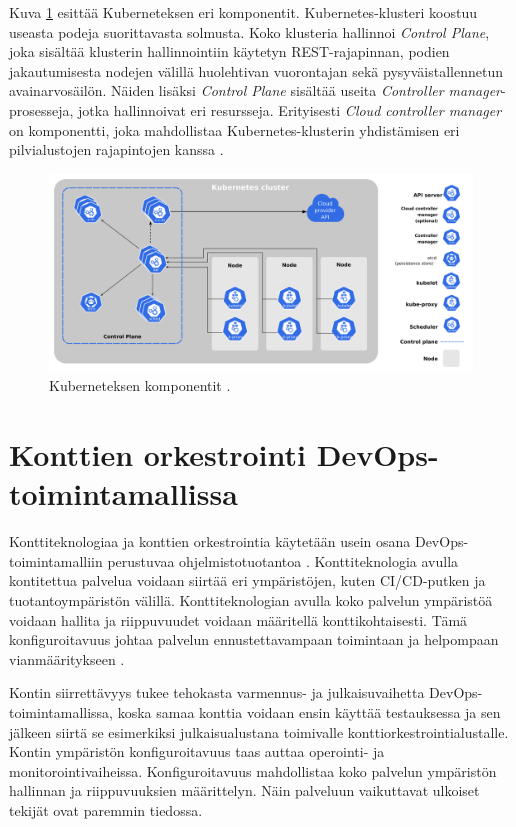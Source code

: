 Kuva \ref{fig:kubernetes} esittää Kuberneteksen eri komponentit.
Kubernetes-klusteri koostuu useasta podeja suorittavasta solmusta.
Koko klusteria hallinnoi \textit{Control Plane}, joka sisältää klusterin hallinnointiin käytetyn REST-rajapinnan, podien jakautumisesta nodejen välillä huolehtivan vuorontajan sekä pysyväistallennetun avainarvosäilön.
Näiden lisäksi \textit{Control Plane} sisältää useita \textit{Controller manager}-prosesseja, jotka hallinnoivat eri resursseja.
Erityisesti \textit{Cloud controller manager} on komponentti, joka mahdollistaa Kubernetes-klusterin yhdistämisen eri pilvialustojen rajapintojen kanssa \cite{components23}.

\begin{figure}[ht]
\begin{center}
\includegraphics[width=1\textwidth]{figures/kubernetes_components.png}
\caption{Kuberneteksen komponentit \cite{components23}\label{fig:kubernetes}.}
\end{center}
\end{figure}

\section{Konttien orkestrointi DevOps-toimintamallissa\label{orchestration:devops}}

Konttiteknologiaa ja konttien orkestrointia käytetään usein osana DevOps-toimintamalliin perustuvaa ohjelmistotuotantoa \cite{Kang16, Narasimhulu23}.
Konttiteknologia avulla kontitettua palvelua voidaan siirtää eri ympäristöjen, kuten CI/CD-putken ja tuotantoympäristön välillä.
Konttiteknologian avulla koko palvelun ympäristöä voidaan hallita ja riippuvuudet voidaan määritellä konttikohtaisesti.
Tämä konfiguroitavuus johtaa palvelun ennustettavampaan toimintaan ja helpompaan vianmääritykseen \cite{Narasimhulu23}.

Kontin siirrettävyys tukee tehokasta varmennus- ja julkaisuvaihetta DevOps-toimintamal\-lissa, koska samaa konttia voidaan ensin käyttää testauksessa ja sen jälkeen siirtä se esimerkiksi julkaisualustana toimivalle konttiorkestrointialustalle.
Kontin ympäristön konfiguroitavuus taas auttaa operointi- ja monitorointivaiheissa.
Konfiguroitavuus mahdollistaa koko palvelun ympäristön hallinnan ja riippuvuuksien määrittelyn.
Näin palveluun vaikuttavat ulkoiset tekijät ovat paremmin tiedossa. %

